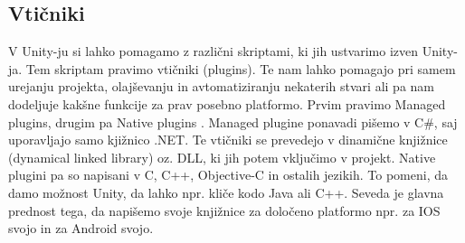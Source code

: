 {\color{indiagreen}\subsection{Vtičniki}}
V Unity-ju si lahko pomagamo z različni skriptami, ki jih ustvarimo izven Unity-ja. Tem skriptam pravimo vtičniki (plugins). Te nam lahko pomagajo pri samem urejanju projekta, olajševanju in avtomatiziranju nekaterih stvari ali pa nam dodeljuje kakšne funkcije za prav posebno platformo. Prvim pravimo Managed plugins, drugim pa Native plugins \cite{manual}. Managed plugine ponavadi pišemo v C\#, saj uporavljajo samo kjižnico .NET. Te vtičniki se prevedejo v dinamične knjižnice (dynamical linked library) oz. DLL, ki jih potem vključimo v projekt. Native plugini pa so napisani v C, C++, Objective-C in ostalih jezikih. To pomeni, da damo možnost Unity, da lahko npr. kliče kodo Java ali C++. Seveda je glavna prednost tega, da napišemo svoje knjižnice za določeno platformo npr. za IOS svojo in za Android svojo. 